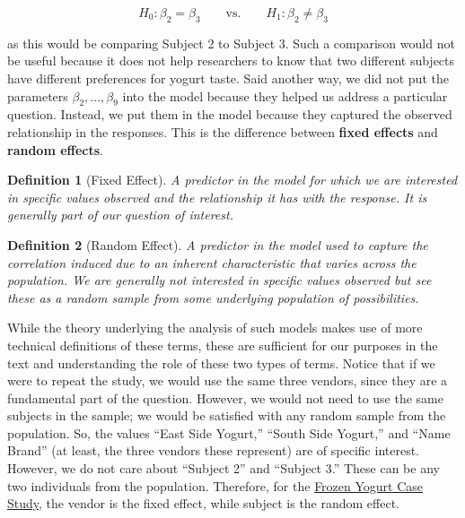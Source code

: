 \documentclass[
]{book}
\theoremstyle{plain}
\theoremstyle{mydefn}
\newtheorem{definition}{Definition}[chapter]
\theoremstyle{myexmpl}
\theoremstyle{remark}
\begin{document}
\[H_0: \beta_2 = \beta_3 \qquad \text{vs.} \qquad H_1: \beta_2 \neq \beta_3\]

as this would be comparing Subject 2 to Subject 3. Such a comparison would not be useful because it does not help researchers to know that two different subjects have different preferences for yogurt taste. Said another way, we did not put the parameters \(\beta_2, \dotsc, \beta_9\) into the model because they helped us address a particular question. Instead, we put them in the model because they captured the observed relationship in the responses. This is the difference between \textbf{fixed effects} and \textbf{random effects}.

\begin{definition}[Fixed Effect]
\protect\hypertarget{def:defn-fixed-effect}{}{\label{def:defn-fixed-effect} {} }A predictor in the model for which we are interested in specific values observed and the relationship it has with the response. It is generally part of our question of interest.
\end{definition}

\begin{definition}[Random Effect]
\protect\hypertarget{def:defn-random-effect}{}{\label{def:defn-random-effect} {} }A predictor in the model used to capture the correlation induced due to an inherent characteristic that varies across the population. We are generally not interested in specific values observed but see these as a random sample from some underlying population of possibilities.\\
\end{definition}

While the theory underlying the analysis of such models makes use of more technical definitions of these terms, these are sufficient for our purposes in the text and understanding the role of these two types of terms. Notice that if we were to repeat the study, we would use the same three vendors, since they are a fundamental part of the question. However, we would not need to use the same subjects in the sample; we would be satisfied with any random sample from the population. So, the values ``East Side Yogurt,'' ``South Side Yogurt,'' and ``Name Brand'' (at least, the three vendors these represent) are of specific interest. However, we do not care about ``Subject 2'' and ``Subject 3.'' These can be any two individuals from the population. Therefore, for the \protect\hyperlink{CaseYogurt}{Frozen Yogurt Case Study}, the vendor is the fixed effect, while subject is the random effect.
\end{document}
